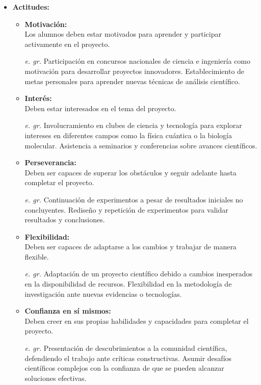 \begin{itemize}
\begin{itemize}
    \end{itemize}
    \item \textbf{Actitudes:}
    \begin{itemize}
        \item \textbf{Motivación:}\\
        Los alumnos deben estar motivados para aprender y participar activamente en el proyecto.
        \item[\textit{e. gr.}]Participación en concursos nacionales de ciencia e ingeniería como motivación para desarrollar proyectos innovadores. Establecimiento de metas personales para aprender nuevas técnicas de análisis científico.
        \item \textbf{Interés:}\\
        Deben estar interesados en el tema del proyecto.
        \item[\textit{e. gr.}] Involucramiento en clubes de ciencia y tecnología para explorar intereses en diferentes campos como la física cuántica o la biología molecular. Asistencia a seminarios y conferencias sobre avances científicos.
       \item \textbf{Perseverancia: }\\
       Deben ser capaces de superar los obstáculos y seguir adelante hasta completar el proyecto.
       \item[\textit{e. gr.}] Continuación de experimentos a pesar de resultados iniciales no concluyentes.
Rediseño y repetición de experimentos para validar resultados y conclusiones.
      \item \textbf{Flexibilidad: } \\
      Deben ser capaces de adaptarse a los cambios y trabajar de manera flexible.
      \item[\textit{e. gr.}] Adaptación de un proyecto científico debido a cambios inesperados en la disponibilidad de recursos. Flexibilidad en la metodología de investigación ante nuevas evidencias o tecnologías.
      \item \textbf{Confianza en sí mismos:}\\
      Deben creer en sus propias habilidades y capacidades para completar el proyecto.
      \item[\textit{e. gr.}]
      Presentación de descubrimientos a la comunidad científica, defendiendo el trabajo ante críticas constructivas. Asumir desafíos científicos complejos con la confianza de que se pueden alcanzar soluciones efectivas.
    \end{itemize}
\end{itemize}


